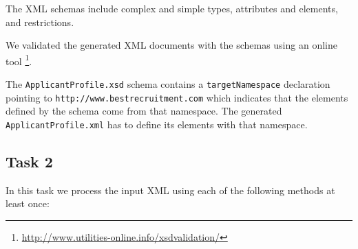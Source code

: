 \documentclass[a4paper, 11pt]{article}
\begin{document}
The XML schemas include complex and simple types, attributes and elements, and restrictions.

We validated the generated XML documents with the schemas using an online tool \footnote{\url{http://www.utilities-online.info/xsdvalidation/}}.

The \texttt{ApplicantProfile.xsd} schema contains a \texttt{targetNamespace} declaration pointing to \texttt{http://www.bestrecruitment.com} which indicates that the elements defined by the schema come from that namespace. The generated \texttt{ApplicantProfile.xml} has to define its elements with that namespace.

\subsection{Task 2}

In this task we process the input XML using each of the following methods at least once:
\end{document}
